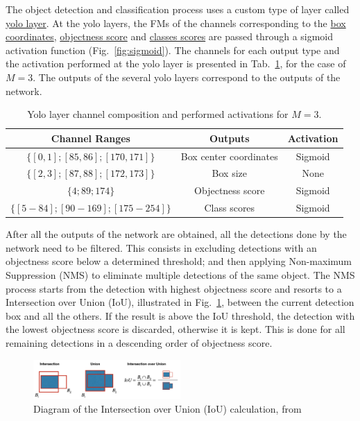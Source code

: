 The object detection and classification process uses a custom type of layer
called \underline{yolo layer}. At the yolo layers, the FMs of the channels
corresponding to the \underline{box coordinates}, \underline{objectness score}
and \underline{classes scores} are passed through a sigmoid activation function
(Fig.~\ref{fig:sigmoid}). The channels for each output type and the activation
performed at the yolo layer is presented in
Tab.~\ref{tab:yolov3_channel_division}, for the case of $M=3$. The outputs of
the several yolo layers correspond to the outputs of the network.

\begin{table}[!htb]
	\renewcommand{\arraystretch}{1.2} %
	\centering
	\begin{tabular}{ccc}
		\toprule
		Channel Ranges           & Outputs & Activation  \\
		\midrule
		$\{[0,1];[85,86];[170,171]\}$       & Box center coordinates   & Sigmoid \\
		$\{[2,3];[87,88];[172,173]\}$       & Box size   & None \\
		$\{4;89;174\}$       & Objectness score   & Sigmoid \\
		$\{[5-84];[90-169];[175-254]\}$       & Class scores   & Sigmoid \\
		\bottomrule
	\end{tabular}
	\caption[Table caption shown in TOC.]{Yolo layer channel composition and performed activations for $M=3$.}
	\label{tab:yolov3_channel_division}
\end{table}

After all the outputs of the network are obtained, all the detections done by
the network need to be filtered. This consists in excluding detections with an
objectness score below a determined threshold; and then applying Non-maximum
Suppression (NMS) to eliminate multiple detections of the same object. The NMS
process starts from the detection with highest objectness score and resorts to a
Intersection over Union (IoU), illustrated in Fig.~\ref{fig:IoU}, 
between the current detection box and all the
others. If the result is above the IoU
threshold, the detection with the lowest objectness score is discarded,
otherwise it is kept. This is done for all remaining detections in a descending
order of objectness score.
\begin{figure}[!htb]
	\centering
	\includegraphics[width=0.5\textwidth]{Figures/IoU.png}
	\caption[Caption for figure in TOC.]{Diagram of the Intersection over Union (IoU) calculation, from~\cite{IoU_image_credit}}
	\label{fig:IoU}
\end{figure}

